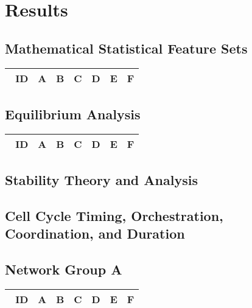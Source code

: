 \documentclass[preprint, 8pt]{elsarticle}
\theoremstyle{definition}
\begin{document}
\section{Results}

\subsection{Mathematical Statistical Feature Sets}

\begin{table}[H]\centering
\begin{tabular}{p{1cm}p{1cm}p{1cm}p{1cm}p{1cm}p{1cm}p{4cm}}\
ID & A & B & C & D & E & F \\
\hline
\hline
\end{tabular}
\end{table}

\subsection{Equilibrium Analysis}

\begin{table}[H]\centering
\begin{tabular}{p{1cm}p{1cm}p{1cm}p{1cm}p{1cm}p{1cm}p{4cm}}\
ID & A & B & C & D & E & F \\
\hline
\hline
\end{tabular}
\end{table}

\subsection{Stability Theory and Analysis}

\subsection{Cell Cycle Timing, Orchestration, Coordination, and Duration}

\subsection{Network Group A}

\begin{table}[H]\centering
\begin{tabular}{p{1cm}p{1cm}p{1cm}p{1cm}p{1cm}p{1cm}p{4cm}}\
ID & A & B & C & D & E & F \\
\hline
\hline
\end{tabular}
\end{table}
\end{document}
